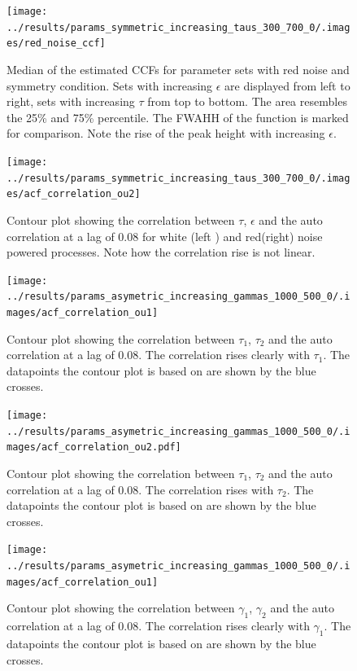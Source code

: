 \documentclass[a4paper,12pt,oneside]{book}
\theoremstyle{break}
\begin{document}
\begin{figure}[htp]
	\texttt{[image: ../results/params\_symmetric\_increasing\_taus\_300\_700\_0/.images/red\_noise\_ccf]}%
	\caption{Median of the estimated CCFs for parameter sets with red noise and symmetry condition. Sets with increasing $\epsilon$ are displayed from left to right, sets with increasing $\tau$ from top to bottom. The area resembles the 25\% and 75\% percentile. The \ac{FWAHH} of the function is marked for comparison. Note the rise of the peak height with increasing $\epsilon$. }%
	\label{f/a/ccf_red_sym}
\end{figure}

\begin{figure}[htp]
	\texttt{[image: ../results/params\_symmetric\_increasing\_taus\_300\_700\_0/.images/acf\_correlation\_ou2]}%
	\caption{Contour plot showing the correlation between $\tau$, $\epsilon$ and the auto correlation at a lag of 0.08 for white (left ) and red(right) noise powered processes. Note how the correlation rise is not linear.}%
	\label{f/a/acf_white_sym_correlation_ou2}%
\end{figure}

\begin{figure}
	\texttt{[image: ../results/params\_asymetric\_increasing\_gammas\_1000\_500\_0/.images/acf\_correlation\_ou1]}%
	\caption{Contour plot showing the correlation between $\tau_1$, $\tau_2$ and the auto correlation at a lag of 0.08. The correlation rises clearly with $\tau_1$. The datapoints  the contour plot is based on are shown by the blue crosses.}%
	\label{f/a/acf_white_asym_correlation_tau_ou1}
\end{figure}

\begin{figure}
	\texttt{[image: ../results/params\_asymetric\_increasing\_gammas\_1000\_500\_0/.images/acf\_correlation\_ou2.pdf]}%
	\caption{Contour plot showing the correlation between $\tau_1$, $\tau_2$ and the auto correlation at a lag of 0.08. The correlation rises with $\tau_2$. The datapoints  the contour plot is based on are shown by the blue crosses.}%
	\label{f/a/acf_white_asym_correlation_tau_ou2}
\end{figure}

\begin{figure}
	\texttt{[image: ../results/params\_asymetric\_increasing\_gammas\_1000\_500\_0/.images/acf\_correlation\_ou1]}%
	\caption{Contour plot showing the correlation between $\gamma_1$, $\gamma_2$ and the auto correlation at a lag of 0.08. The correlation rises clearly with $\gamma_1$. The datapoints  the contour plot is based on are shown by the blue crosses.}%
	\label{f/a/acf_white_asym_correlation_gamma_ou1}
\end{figure}
\end{document}
